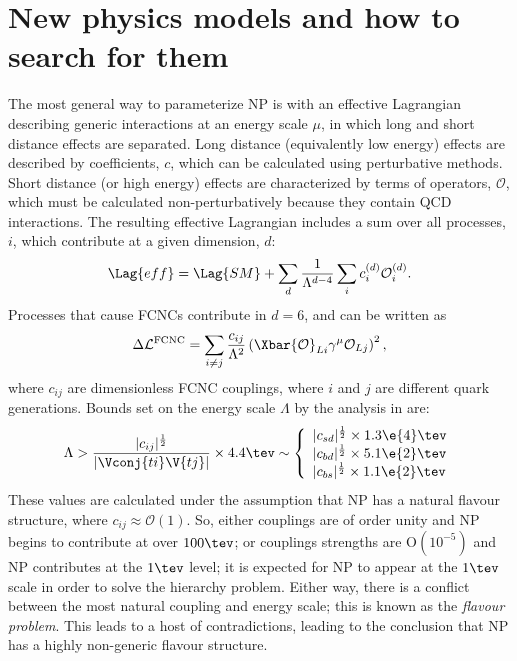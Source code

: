 \section{New physics models and how to search for them}

The most general way to parameterize NP is with an effective Lagrangian describing generic
interactions at an energy scale $\mu$, in which long and short distance effects are separated.
Long distance (equivalently low energy) effects are described by coefficients, $c$, which can be
calculated using perturbative methods.
Short distance (or high energy) effects are characterized by terms of operators, $\mathcal{O}$,
which must be calculated non-perturbatively because they contain QCD interactions.
The resulting effective Lagrangian includes a sum over all processes, $i$, which contribute at a
given dimension, $d$:
\begin{equation}
  \Lag{eff}
  =
  \Lag{SM} + \sum_d\frac1{\Lambda^{d-4}}
  \sum_ic_i^{(d)}\mathcal{O}_i^{(d)}.
  \label{eq:th:lageff}
\end{equation}
Processes that cause FCNCs contribute in $d=6$, and can be written as
\begin{equation}
  \Delta\mathcal{L}^\mathrm{FCNC}
  =
  \sum_{i\neq j}\frac{c_{ij}}{\Lambda^2}
  \left(\Xbar{\mathcal{O}}_{Li}\gamma^\mu\mathcal{O}_{Lj}\right)^2,
\end{equation}
where $c_{ij}$ are dimensionless FCNC couplings, where $i$ and $j$ are different quark generations.
Bounds set on the energy scale $\Lambda$ by the analysis in  are:
\begin{equation}
  \Lambda > \frac{|c_{ij}|^\frac12}{|\Vconj{ti}\V{tj}|}\times4.4\tev
  \sim
  \left\{
    \begin{array}{l}
      |c_{sd}|^\frac12\times 1.3\e{4}\tev \\
      |c_{bd}|^\frac12\times 5.1\e{2}\tev \\
      |c_{bs}|^\frac12\times 1.1\e{2}\tev \\
    \end{array}\right.
\end{equation}
These values are calculated under the assumption that NP has a natural flavour structure, where
$c_{ij}\approx\mathcal{O}(1)$.
So, either couplings are of order unity and NP begins to contribute at over $100\tev$; or couplings
strengths are $\mathrm{O}(10^{-5})$ and NP contributes at the $1\tev$ level;
it is expected for NP to appear at the $1\tev$ scale in order to solve the hierarchy problem.
Either way, there is a conflict between the most natural coupling and energy scale; this is known
as the \emph{flavour problem}.
This leads to a host of contradictions, leading to the conclusion that NP has a highly non-generic
flavour structure.

